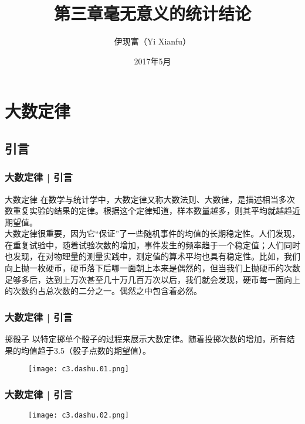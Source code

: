 



\title[无意义的统计]{第三章\quad 毫无意义的统计结论}
\author[Yixf]{伊现富（Yi Xianfu）}
\date{2017年5月}



\section{大数定律}
\subsection{引言}
\begin{frame}
  \frametitle{大数定律 | 引言}
  \begin{block}{大数定律}
    在数学与统计学中，大数定律又称大数法则、大数律，是描述相当多次数重复实验的结果的定律。根据这个定律知道，样本数量越多，则其平均就越趋近期望值。\\
    \vspace{1em}
大数定律很重要，因为它“保证”了一些随机事件的均值的长期稳定性。人们发现，在重复试验中，随着试验次数的增加，事件发生的频率趋于一个稳定值；人们同时也发现，在对物理量的测量实践中，测定值的算术平均也具有稳定性。比如，我们向上抛一枚硬币，硬币落下后哪一面朝上本来是偶然的，但当我们上抛硬币的次数足够多后，达到上万次甚至几十万几百万次以后，我们就会发现，硬币每一面向上的次数约占总次数的二分之一。偶然之中包含着必然。
  \end{block}
\end{frame}

\begin{frame}
  \frametitle{大数定律 | 引言}
  \begin{block}{掷骰子}
    以特定掷单个骰子的过程来展示大数定律。随着投掷次数的增加，所有结果的均值趋于3.5（骰子点数的期望值）。
    \vspace{-1.2em}
    \begin{figure}
      \centering
      \texttt{[image: c3.dashu.01.png]}
    \end{figure}
  \end{block}
\end{frame}

\begin{frame}
  \frametitle{大数定律 | 引言}
  \begin{figure}
    \centering
    \texttt{[image: c3.dashu.02.png]}
  \end{figure}
\end{frame}

